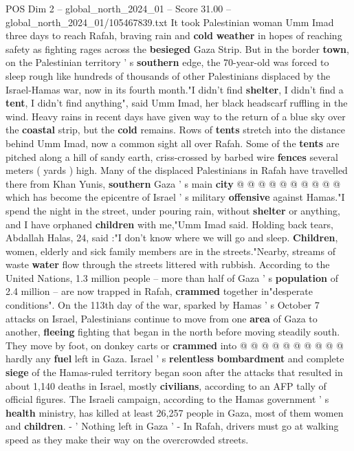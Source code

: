 \begin{textsample}{POS Dim 2 – global\_north\_2024\_01 – Score 31.00 – global\_north\_2024\_01/105467839.txt}  \label{ex:f2_pos_206}
It took Palestinian woman Umm Imad three days to reach Rafah, braving rain and \textbf{cold} \textbf{weather} in hopes of reaching safety as fighting rages across the \textbf{besieged} Gaza Strip.
But in the border \textbf{town}, on the Palestinian territory ' s \textbf{southern} edge, the 70-year-old was forced to sleep rough like hundreds of thousands of other Palestinians displaced by the Israel-Hamas war, now in its fourth month."I didn't find \textbf{shelter}, I didn't find a \textbf{tent}, I didn't find anything", said Umm Imad, her black headscarf ruffling in the wind.
Heavy rains in recent days have given way to the return of a blue sky over the \textbf{coastal} strip, but the \textbf{cold} remains.
Rows of \textbf{tents} stretch into the distance behind Umm Imad, now a common sight all over Rafah.
Some of the \textbf{tents} are pitched along a hill of sandy earth, criss-crossed by barbed wire \textbf{fences} several meters ( yards ) high.
Many of the displaced Palestinians in Rafah have travelled there from Khan Yunis, \textbf{southern} Gaza ' s main \textbf{city} @ @ @ @ @ @ @ @ @ @ which has become the epicentre of Israel ' s military \textbf{offensive} against Hamas."I spend the night in the street, under pouring rain, without \textbf{shelter} or anything, and I have orphaned \textbf{children} with me,"Umm Imad said.
Holding back tears, Abdallah Halas, 24, said :"I don't know where we will go and sleep. \textbf{Children}, women, elderly and sick family members are in the streets."Nearby, streams of waste \textbf{water} flow through the streets littered with rubbish.
According to the United Nations, 1.3 million people -- more than half of Gaza ' s \textbf{population} of 2.4 million -- are now trapped in Rafah, \textbf{crammed} together in"desperate conditions".
On the 113th day of the war, sparked by Hamas ' s October 7 attacks on Israel, Palestinians continue to move from one \textbf{area} of Gaza to another, \textbf{fleeing} fighting that began in the north before moving steadily south.
They move by foot, on donkey carts or \textbf{crammed} into @ @ @ @ @ @ @ @ @ @ hardly any \textbf{fuel} left in Gaza.
Israel ' s \textbf{relentless} \textbf{bombardment} and complete \textbf{siege} of the Hamas-ruled territory began soon after the attacks that resulted in about 1,140 deaths in Israel, mostly \textbf{civilians}, according to an AFP tally of official figures.
The Israeli campaign, according to the Hamas government ' s \textbf{health} ministry, has killed at least 26,257 people in Gaza, most of them women and \textbf{children}. - ' Nothing left in Gaza ' - In Rafah, drivers must go at walking speed as they make their way on the overcrowded streets.

\end{textsample}

